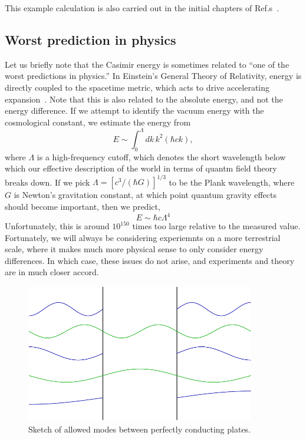 This example calculation is also carried out in the initial chapters of Ref.s~\cite{Milton2001,Bordag2009,Dalvit2011}.

\subsection{Worst prediction in physics}

Let us briefly note that the Casimir energy is sometimes related to ``one of the worst predictions in physics.''  In Einstein's General Theory of Relativity, energy is directly coupled to the spacetime metric, which acts to drive accelerating expansion~\cite{Carrol2009}.  Note that this is also related to the absolute energy, and not the energy difference. If we attempt to identify the vacuum energy with the cosmological constant, we estimate the energy from 
\begin{equation}
E \sim \int_0^\Lambda dk\,k^2 (\hbar c k),
\end{equation}
where $\Lambda$ is a high-frequency cutoff, which denotes the short wavelength below which our effective description of the world in terms of quantm field theory breaks down.  If we pick $\Lambda=[c^3/(\hbar G)]^{1/3}$ to be the Plank wavelength, where $G$ is Newton's gravitation constant, at which point quantum gravity effects should become important, then we predict, 
\begin{equation}
E \sim \hbar c \Lambda^4 
\end{equation}
Unfortunately, this is around $10^{150}$ times too large relative to the measured value.  
Fortunately, we will always be considering experiemnts on a more terrestrial scale, where it makes much more physical sense to only consider energy differences.  In which case, these issues do not arise, and experiments and theory are in much closer accord.    

\begin{figure}
\center
\includegraphics[width=10cm]{fig/intro/twoplanes_wave}
\caption{Sketch of allowed modes between perfectly conducting plates.}
\end{figure}



